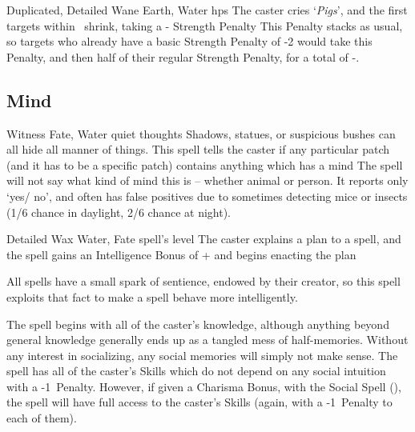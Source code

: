 \begin{multicols}{2}
{  %
    {Duplicated, Detailed}%
    {Wane}%
    {Earth, Water}%
    {\glspl{hp}}%
    {The caster cries `\textit{Pigs}', and the first  targets within \spellRange\ shrink, taking a - Strength Penalty}%
    {
    This Penalty stacks as usual, so targets who already have a basic Strength Penalty of -2 would take this Penalty, and then half of their regular Strength Penalty, for a total of -.}

}

\subsection{Mind}
\label{mindSpells}



  {}%
  {Witness}%
  {Fate, Water}%
  {quiet thoughts}%
  {Shadows, statues, or suspicious bushes can all hide all manner of things.
  This spell tells the caster if any particular patch (and it has to be a specific patch) contains anything which has a mind}%
  {
    The spell will not say what kind of mind this is -- whether animal or person.
    It reports only `yes/ no', and often has false positives due to sometimes detecting mice or insects (1/6 chance in daylight, 2/6 chance at night).}


  {Detailed}%
  {Wax}%
  {Water, Fate}%
  {spell's level}%
  {The caster explains a plan to a spell, and the spell gains an Intelligence Bonus of + and begins enacting the plan}%
  {
  All spells have a small spark of sentience, endowed by their creator, so this spell exploits that fact to make a spell behave more intelligently.

  The spell begins with all of the caster's knowledge, although anything beyond general knowledge generally ends up as a tangled mess of half-memories.
  Without any interest in socializing, any social memories will simply not make sense.
  The spell has all of the caster's Skills which do not depend on any social intuition with a -1~Penalty.
  However, if given a Charisma Bonus, with the Social Spell (), the spell will have full access to the caster's Skills (again, with a -1~Penalty to each of them).

}
\end{multicols}
